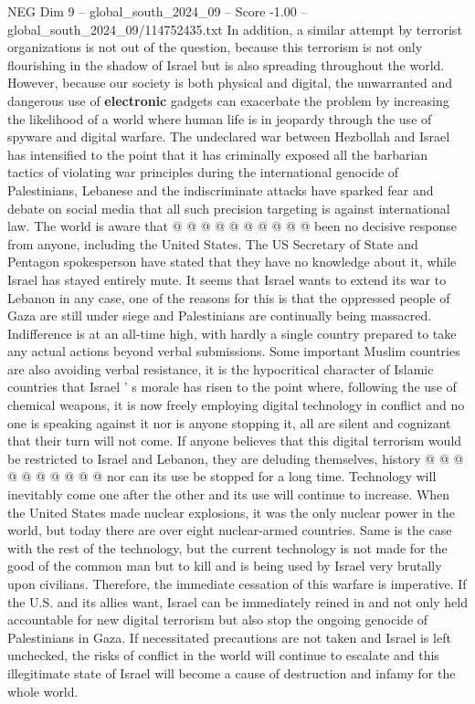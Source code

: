 \begin{textsample}{NEG Dim 9 – global\_south\_2024\_09 – Score -1.00 – global\_south\_2024\_09/114752435.txt}
In addition, a similar attempt by terrorist organizations is not out of the question, because this terrorism is not only flourishing in the shadow of Israel but is also spreading throughout the world.
However, because our society is both physical and digital, the unwarranted and dangerous use of \textbf{electronic} gadgets can exacerbate the problem by increasing the likelihood of a world where human life is in jeopardy through the use of spyware and digital warfare.
The undeclared war between Hezbollah and Israel has intensified to the point that it has criminally exposed all the barbarian tactics of violating war principles during the international genocide of Palestinians, Lebanese and the indiscriminate attacks have sparked fear and debate on social media that all such precision targeting is against international law.
The world is aware that @ @ @ @ @ @ @ @ @ @ been no decisive response from anyone, including the United States.
The US Secretary of State and Pentagon spokesperson have stated that they have no knowledge about it, while Israel has stayed entirely mute.
It seems that Israel wants to extend its war to Lebanon in any case, one of the reasons for this is that the oppressed people of Gaza are still under siege and Palestinians are continually being massacred.
Indifference is at an all-time high, with hardly a single country prepared to take any actual actions beyond verbal submissions.
Some important Muslim countries are also avoiding verbal resistance, it is the hypocritical character of Islamic countries that Israel ' s morale has risen to the point where, following the use of chemical weapons, it is now freely employing digital technology in conflict and no one is speaking against it nor is anyone stopping it, all are silent and cognizant that their turn will not come.
If anyone believes that this digital terrorism would be restricted to Israel and Lebanon, they are deluding themselves, history @ @ @ @ @ @ @ @ @ @ nor can its use be stopped for a long time.
Technology will inevitably come one after the other and its use will continue to increase.
When the United States made nuclear explosions, it was the only nuclear power in the world, but today there are over eight nuclear-armed countries.
Same is the case with the rest of the technology, but the current technology is not made for the good of the common man but to kill and is being used by Israel very brutally upon civilians.
Therefore, the immediate cessation of this warfare is imperative.
If the U.S. and its allies want, Israel can be immediately reined in and not only held accountable for new digital terrorism but also stop the ongoing genocide of Palestinians in Gaza.
If necessitated precautions are not taken and Israel is left unchecked, the risks of conflict in the world will continue to escalate and this illegitimate state of Israel will become a cause of destruction and infamy for the whole world.

\end{textsample}
